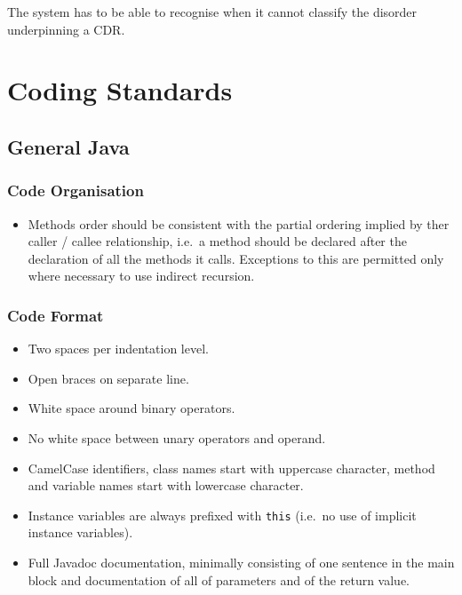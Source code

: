 \documentclass[a4paper,fleqn]{article}
\newcommand{\computercode}[1]{\texttt{#1}}
\begin{document}
The system has to be able to recognise when it cannot classify the
disorder underpinning a CDR.

\section{Coding Standards}


\subsection{General Java}

\subsubsection{Code Organisation}

\begin{itemize}

\item Methods order should be consistent with the partial ordering
  implied by ther caller / callee relationship, i.e.\ a method should
  be declared after the declaration of all the methods it
  calls. Exceptions to this are permitted only where necessary to use
  indirect recursion.

\end{itemize}


\subsubsection{Code Format}

\begin{itemize}

\item Two spaces per indentation level.

\item Open braces on separate line.

\item White space around binary operators.

\item No white space between unary operators and operand.

\item CamelCase identifiers, class names start with uppercase
  character, method and variable names start with lowercase character.

\item Instance variables are always prefixed with \computercode{this}
  (i.e.\ no use of implicit instance variables).

\item Full Javadoc documentation, minimally consisting of one sentence
  in the main block and documentation of all of parameters and of the
  return value.

\end{itemize}
\end{document}
